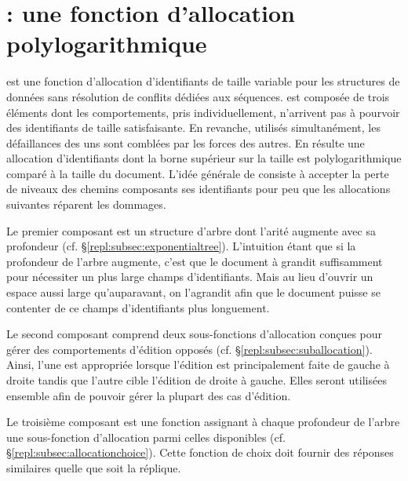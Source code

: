 
\section{\LSEQ : une fonction d'allocation polylogarithmique}
\label{repl:sec:proposal}

\LSEQ est une fonction d'allocation d'identifiants de taille variable pour les
structures de données sans résolution de conflits dédiées aux séquences. \LSEQ
est composée de trois éléments dont les comportements, pris individuellement,
n'arrivent pas à pourvoir des identifiants de taille satisfaisante. En revanche,
utilisés simultanément, les défaillances des uns sont comblées par les forces
des autres. En résulte une allocation d'identifiants dont la borne supérieur sur
la taille est polylogarithmique comparé à la taille du document. L'idée générale
de \LSEQ consiste à accepter la perte de niveaux des chemins composants ses
identifiants pour peu que les allocations suivantes réparent les dommages.

Le premier composant est un structure d'arbre dont l'arité augmente avec sa
profondeur (cf. §\ref{repl:subsec:exponentialtree}). L'intuition étant que si la
profondeur de l'arbre augmente, c'est que le document à grandit suffisamment
pour nécessiter un plus large champs d'identifiants. Mais au lieu d'ouvrir un
espace aussi large qu'auparavant, on l'agrandit afin que le document puisse se
contenter de ce champs d'identifiants plus longuement.

Le second composant comprend deux sous-fonctions d'allocation conçues pour gérer
des comportements d'édition opposés (cf. §\ref{repl:subsec:suballocation}). Ainsi,
l'une est appropriée lorsque l'édition est principalement faite de gauche à
droite tandis que l'autre cible l'édition de droite à gauche. Elles seront
utilisées ensemble afin de pouvoir gérer la plupart des cas d'édition.

Le troisième composant est une fonction assignant à chaque profondeur de l'arbre
une sous-fonction d'allocation parmi celles disponibles
(cf. §\ref{repl:subsec:allocationchoice}). Cette fonction de choix doit fournir des
réponses similaires quelle que soit la réplique.

